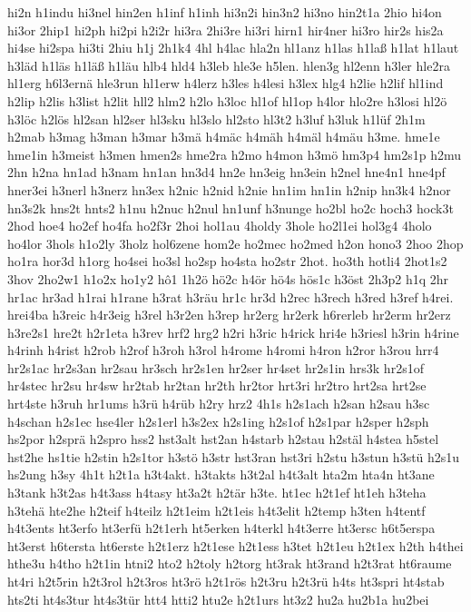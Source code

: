 {hi2n
h1indu
hi3nel
hin2en
h1inf
h1inh
hi3n2i
hin3n2
hi3no
hin2t1a
2hio
hi4on
hi3or
2hip1
hi2ph
hi2pi
h2i2r
hi3ra
2hi3re
hi3ri
hirn1
hir4ner
hi3ro
hir2s
his2a
hi4se
hi2spa
hi3ti
2hiu
h1j
2h1k4
4hl
h4lac
hla2n
hl1anz
h1las
h1laß
h1lat
h1laut
h3läd
h1läs
h1läß
h1läu
hlb4
hld4
h3leb
hle3e
h5len.
hlen3g
hl2enn
h3ler
hle2ra
hl1erg
h6l3ernä
hle3run
hl1erw
h4lerz
h3les
h4lesi
h3lex
hlg4
h2lie
h2lif
hl1ind
h2lip
h2lis
h3list
h2lit
hll2
hlm2
h2lo
h3loc
hl1of
hl1op
h4lor
hlo2re
h3losi
hl2ö
h3löc
h2lös
hl2san
hl2ser
hl3sku
hl3slo
hl2sto
hl3t2
h3luf
h3luk
h1lüf
2h1m
h2mab
h3mag
h3man
h3mar
h3mä
h4mäc
h4mäh
h4mäl
h4mäu
h3me.
hme1e
hme1in
h3meist
h3men
hmen2s
hme2ra
h2mo
h4mon
h3mö
hm3p4
hm2s1p
h2mu
2hn
h2na
hn1ad
h3nam
hn1an
hn3d4
hn2e
hn3eig
hn3ein
h2nel
hne4n1
hne4pf
hner3ei
h3nerl
h3nerz
hn3ex
h2nic
h2nid
h2nie
hn1im
hn1in
h2nip
hn3k4
h2nor
hn3s2k
hns2t
hnts2
h1nu
h2nuc
h2nul
hn1unf
h3nunge
ho2bl
ho2c
hoch3
hock3t
2hod
hoe4
ho2ef
ho4fa
ho2f3r
2hoi
hol1au
4holdy
3hole
ho2l1ei
hol3g4
4holo
ho4lor
3hols
h1o2ly
3holz
hol6zene
hom2e
ho2mec
ho2med
h2on
hono3
2hoo
2hop
ho1ra
hor3d
h1org
ho4sei
ho3sl
ho2sp
ho4sta
ho2str
2hot.
ho3th
hotli4
2hot1s2
3hov
2ho2w1
h1o2x
ho1y2
hô1
1h2ö
hö2c
h4ör
hö4s
hös1c
h3öst
2h3p2
h1q
2hr
hr1ac
hr3ad
h1rai
h1rane
h3rat
h3räu
hr1c
hr3d
h2rec
h3rech
h3red
h3ref
h4rei.
hrei4ba
h3reic
h4r3eig
h3rel
h3r2en
h3rep
hr2erg
hr2erk
h6rerleb
hr2erm
hr2erz
h3re2s1
hre2t
h2r1eta
h3rev
hrf2
hrg2
h2ri
h3ric
h4rick
hri4e
h3riesl
h3rin
h4rine
h4rinh
h4rist
h2rob
h2rof
h3roh
h3rol
h4rome
h4romi
h4ron
h2ror
h3rou
hrr4
hr2s1ac
hr2s3an
hr2sau
hr3sch
hr2s1en
hr2ser
hr4set
hr2s1in
hrs3k
hr2s1of
hr4stec
hr2su
hr4sw
hr2tab
hr2tan
hr2th
hr2tor
hrt3ri
hr2tro
hrt2sa
hrt2se
hrt4ste
h3ruh
hr1ums
h3rü
h4rüb
h2ry
hrz2
4h1s
h2s1ach
h2san
h2sau
h3sc
h4schan
h2s1ec
hse4ler
h2s1erl
h3s2ex
h2s1ing
h2s1of
h2s1par
h2sper
h2sph
hs2por
h2sprä
h2spro
hss2
hst3alt
hst2an
h4starb
h2stau
h2stäl
h4stea
h5stel
hst2he
hs1tie
h2stin
h2s1tor
h3stö
h3str
hst3ran
hst3ri
h2stu
h3stun
h3stü
h2s1u
hs2ung
h3sy
4h1t
h2t1a
h3t4akt.
h3takts
h3t2al
h4t3alt
hta2m
hta4n
ht3ane
h3tank
h3t2as
h4t3ass
h4tasy
ht3a2t
h2tär
h3te.
ht1ec
h2t1ef
ht1eh
h3teha
h3tehä
hte2he
h2teif
h4teilz
h2t1eim
h2t1eis
h4t3elit
h2temp
h3ten
h4tentf
h4t3ents
ht3erfo
ht3erfü
h2t1erh
ht5erken
h4terkl
h4t3erre
ht3ersc
h6t5erspa
ht3erst
h6tersta
ht6erste
h2t1erz
h2t1ese
h2t1ess
h3tet
h2t1eu
h2t1ex
h2th
h4thei
hthe3u
h4tho
h2t1in
htni2
hto2
h2toly
h2torg
ht3rak
ht3rand
h2t3rat
ht6raume
ht4ri
h2t5rin
h2t3rol
h2t3ros
ht3rö
h2t1rös
h2t3ru
h2t3rü
h4ts
ht3spri
ht4stab
hts2ti
ht4s3tur
ht4s3tür
htt4
htti2
htu2e
h2t1urs
ht3z2
hu2a
hu2b1a
hu2bei
}
